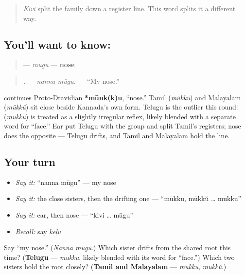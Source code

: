 \label{lesson:KA-C37-moogu}



\begin{quote}
\emph{Kivi} split the family down a register line. This word splits it a different way.
\end{quote}

\subsection*{You'll want to know: }
\begin{quote}
\textbf{} — \emph{mūgu} — \textbf{nose}
\end{quote}

\begin{quote}
\textbf{ .} — \emph{nanna mūgu.} — \textquotedblleft{}My nose.\textquotedblright{}
\end{quote}

\begin{cousinweb}
\textbf{} continues Proto-Dravidian \textbf{*mūnk(k)u}, \textquotedblleft{}nose.\textquotedblright{} Tamil \textbf{} (\emph{mūkku}) and Malayalam \textbf{} (\emph{mūkkŭ}) sit close beside Kannada's own form. Telugu is the outlier this round: \textbf{} (\emph{mukku}) is treated as a slightly irregular reflex, likely blended with a separate word for \textquotedblleft{}face.\textquotedblright{} Ear put Telugu with the group and split Tamil's registers; nose does the opposite — Telugu drifts, and Tamil and Malayalam hold the line.
\end{cousinweb}

\subsection*{Your turn}
\begin{itemize}
\raggedright
  \item \emph{Say it:} \textquotedblleft{}nanna mūgu\textquotedblright{} — my nose
  \item \emph{Say it:} the close sisters, then the drifting one — \textquotedblleft{}mūkku, mūkkŭ … mukku\textquotedblright{}
  \item \emph{Say it:} ear, then nose — \textquotedblleft{}kivi … mūgu\textquotedblright{}
  \item \emph{Recall:} say \emph{kēḷu}
\end{itemize}

\begin{tcolorbox}[breakable,colback=teal!4,colframe=teal!35!black,title={Before you move on}]
Say \textquotedblleft{}my nose.\textquotedblright{} (\emph{Nanna mūgu}.) Which sister drifts from the shared root this time? (\textbf{Telugu} — \emph{mukku}, likely blended with its word for \textquotedblleft{}face.\textquotedblright{}) Which two sisters hold the root closely? (\textbf{Tamil and Malayalam} — \emph{mūkku}, \emph{mūkkŭ}.)
\end{tcolorbox}
